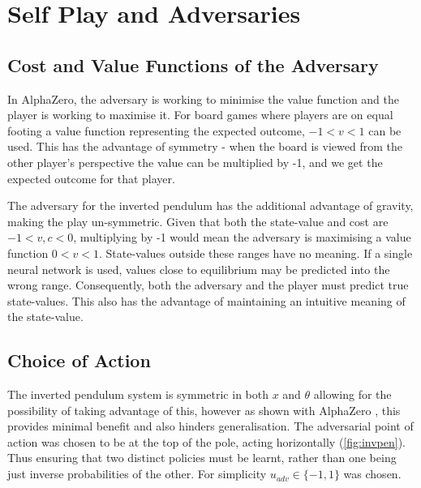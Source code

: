 \documentclass[../main.tex]{subfiles}
\begin{document}
\section{Self Play and Adversaries}

\subsection{Cost and Value Functions of the Adversary}

In AlphaZero, the adversary is working to minimise the value function and the player is working to maximise it. For board games where players are on equal footing a value function representing the expected outcome, $-1 < v < 1$ can be used. This has the advantage of symmetry - when the board is viewed from the other player's perspective the value can be multiplied by -1, and we get the expected outcome for that player.

The adversary for the inverted pendulum has the additional advantage of gravity, making the play un-symmetric. Given that both the state-value and cost are $-1 < v, c < 0$, multiplying by -1 would mean the adversary is maximising a value function $0 < v < 1$. State-values outside these ranges have no meaning. If a single neural network is used, values close to equilibrium may be predicted into the wrong range. Consequently, both the adversary and the player must predict true state-values. This also has the advantage of maintaining an intuitive meaning of the state-value.

\subsection{Choice of Action}

The inverted pendulum system is symmetric in both $x$ and $\theta$ allowing for the possibility of taking advantage of this, however as shown with AlphaZero \cite{AlphaZero}, this provides minimal benefit and also hinders generalisation. The adversarial point of action was chosen to be at the top of the pole, acting horizontally (\cref{fig:invpen}). Thus ensuring that two distinct policies must be learnt, rather than one being just inverse probabilities of the other. For simplicity $u_{adv} \in \{-1, 1\}$ was chosen.
\end{document}

